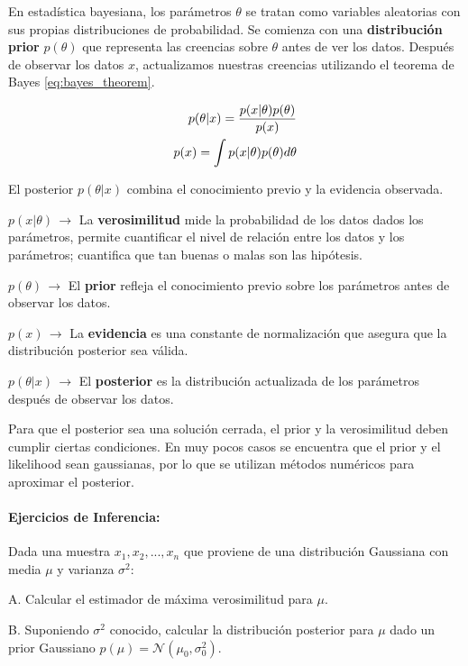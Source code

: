 En estadística bayesiana, los parámetros \(\theta\) se tratan como variables aleatorias con sus propias distribuciones de probabilidad. Se comienza con una \textbf{distribución prior} \(p(\theta)\) que representa las creencias sobre \(\theta\) antes de ver los datos. Después de observar los datos \(x\), actualizamos nuestras creencias utilizando el teorema de Bayes \eqref{eq:bayes_theorem}.

\begin{align}
    p(\theta|x) = \frac{p(x|\theta) p(\theta)}{p(x)} \label{eq:bayes_theorem} \\
    p(x) = \int p(x|\theta) p(\theta) d\theta \notag
\end{align}

El posterior \(p(\theta|x)\) combina el conocimiento previo y la evidencia observada.

\(p(x|\theta)\,\rightarrow\) La \textbf{verosimilitud} mide la probabilidad de los datos dados los parámetros, permite cuantificar el nivel de relación entre los datos y los parámetros; cuantifica que tan buenas o malas son las hipótesis.

\(p(\theta)\,\rightarrow\) El \textbf{prior} refleja el conocimiento previo sobre los parámetros antes de observar los datos.

\(p(x)\,\rightarrow\) La \textbf{evidencia} es una constante de normalización que asegura que la distribución posterior sea válida.

\(p(\theta|x)\,\rightarrow\)  El \textbf{posterior} es la distribución actualizada de los parámetros después de observar los datos.

Para que el posterior sea una solución cerrada, el prior y la verosimilitud deben cumplir ciertas condiciones. En muy pocos casos se encuentra que el prior y el likelihood sean gaussianas, por lo que se utilizan métodos numéricos para aproximar el posterior. 

\paragraph{Ejercicios de Inferencia:} Dada una muestra \(x_1, x_2, ..., x_n\) que proviene de una distribución Gaussiana con media \(\mu\) y varianza \(\sigma^2\):

A. Calcular el estimador de máxima verosimilitud para \(\mu\).

B. Suponiendo \(\sigma^2\) conocido, calcular la distribución posterior para \(\mu\) dado un prior Gaussiano \(p(\mu) = \mathcal{N}(\mu_0, \sigma_0^2)\).

